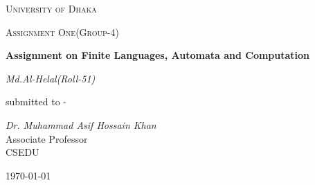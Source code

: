 \documentclass[12pt,a4paper]{report}
\begin{document}
\begin{titlepage}
\centering
{\scshape\LARGE University of Dhaka \par}
\vspace{1cm}
{\scshape\Large Assignment One(Group-4)\par}
\vspace{1.5cm}
{\huge\bfseries Assignment on Finite Languages, Automata and Computation\par}
\vspace{2cm}
{\Large\itshape Md.Al-Helal(Roll-51)\par}
\vfill
submitted to -\par
{\itshape Dr. Muhammad Asif Hossain Khan}\\ Associate Professor\\CSEDU
\vfill
{\large \today\par}
\end{titlepage}
\end{document}
